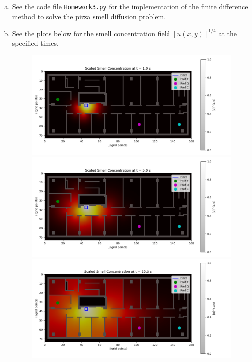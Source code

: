 \documentclass{article}
\begin{document}
\begin{enumerate}[(a)]
  \item See the code file \texttt{Homework3.py} for the implementation of the finite difference method to solve the pizza smell diffusion problem.
  \item See the plots below for the smell concentration field $[u(x,y)]^{1/4}$ at the specified times.
  \begin{figure}[H]
      \centering
      \begin{minipage}{.5\textwidth}
          \centering
          \includegraphics[width=0.8\linewidth]{Q4ts1.png}        
      \end{minipage}
      \begin{minipage}{.5\textwidth}
          \centering
          \includegraphics[width=0.8\linewidth]{Q4ts5.png}
      \end{minipage}     
      \begin{minipage}{.5\textwidth}
          \centering
          \includegraphics[width=0.8\linewidth]{Q4ts25.png}

\end{minipage}
\end{figure}
\end{enumerate}
\end{document}

